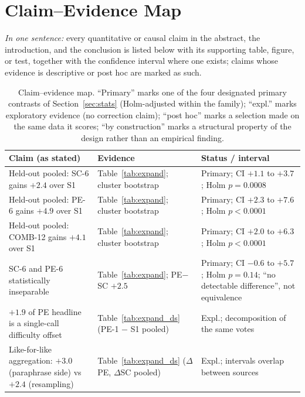 \section{Claim--Evidence Map}
\setcounter{table}{0}
\label{app:claims}

\emph{In one sentence:} every quantitative or causal claim in the abstract, the introduction, and the conclusion is listed below with its supporting table, figure, or test, together with the confidence interval where one exists; claims whose evidence is descriptive or post hoc are marked as such.

\begin{table}[htbp]
\centering
\footnotesize
\caption{Claim--evidence map. ``Primary'' marks one of the four designated primary contrasts of Section~\ref{sec:stats} (Holm-adjusted within the family); ``expl.'' marks exploratory evidence (no correction claim); ``post hoc'' marks a selection made on the same data it scores; ``by construction'' marks a structural property of the design rather than an empirical finding.}
\label{tab:claims}
\begin{tabularx}{\textwidth}{@{}p{}p{}X@{}}
\toprule
Claim (as stated) & Evidence & Status / interval \\
\midrule
Held-out pooled: SC-6 gains $+2.4$ over S1 & Table~\ref{tab:expand}; cluster bootstrap & Primary; CI $+1.1$ to $+3.7$; Holm $p=0.0008$ \\
Held-out pooled: PE-6 gains $+4.9$ over S1 & Table~\ref{tab:expand}; cluster bootstrap & Primary; CI $+2.3$ to $+7.6$; Holm $p<0.0001$ \\
Held-out pooled: COMB-12 gains $+4.1$ over S1 & Table~\ref{tab:expand}; cluster bootstrap & Primary; CI $+2.0$ to $+6.3$; Holm $p<0.0001$ \\
SC-6 and PE-6 statistically inseparable & Table~\ref{tab:expand}; PE$-$SC $+2.5$ & Primary; CI $-0.6$ to $+5.7$; Holm $p=0.14$; ``no detectable difference'', not equivalence \\
$+1.9$ of PE headline is a single-call difficulty offset & Table~\ref{tab:expand_ds} (PE-1 $-$ S1 pooled) & Expl.; decomposition of the same votes \\
Like-for-like aggregation: $+3.0$ (paraphrase side) vs $+2.4$ (resampling) & Table~\ref{tab:expand_ds} ($\Delta$PE, $\Delta$SC pooled) & Expl.; intervals overlap between sources \\

\end{tabularx}
\end{table}
